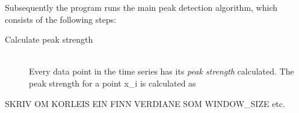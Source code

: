 Subsequently the program runs the main peak detection algorithm, which consists of the following steps:
\begin{description}
\item[Calculate peak strength] \hfill \\
Every data point in the time series has its \emph{peak strength} calculated. The peak strength for a point x_{i} is calculated as 
\end{description}

SKRIV OM KORLEIS EIN FINN VERDIANE SOM WINDOW_SIZE etc. 
